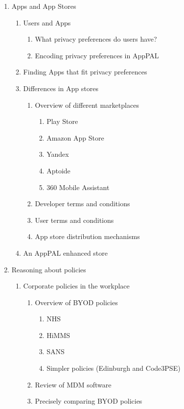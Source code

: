 \documentclass[a4paper]{scrartcl}
\begin{document}
\begin{enumerate}
\item Apps and App Stores
  \begin{enumerate}[4.1]
  \item Users and Apps
    \begin{enumerate}[{4.1.}1]
    \item What privacy preferences do users have?
    \item Encoding privacy preferences in AppPAL
    \end{enumerate}
  \item Finding Apps that fit privacy preferences
  \item Differences in App stores
    \begin{enumerate}[{4.3.}1]
    \item Overview of different marketplaces
      \begin{enumerate}[{4.3.1.}1]
      \item Play Store
      \item Amazon App Store
      \item Yandex
      \item Aptoide
      \item 360 Mobile Assistant
      \end{enumerate}
    \item Developer terms and conditions
    \item User terms and conditions
    \item App store distribution mechanisms
    \end{enumerate}
  \item An AppPAL enhanced store
  \end{enumerate}
\item Reasoning about policies
  \begin{enumerate}[5.1]
  \item Corporate policies in the workplace
    \begin{enumerate}[{5.1.}1]
    \item Overview of BYOD policies 
      \begin{enumerate}[{5.1.1.}1]
      \item NHS
      \item HiMMS
      \item SANS
      \item Simpler policies (Edinburgh and Code3PSE)
      \end{enumerate}
    \item Review of MDM software
    \item Precisely comparing BYOD policies

\end{enumerate}
\end{enumerate}
\end{enumerate}
\end{document}
